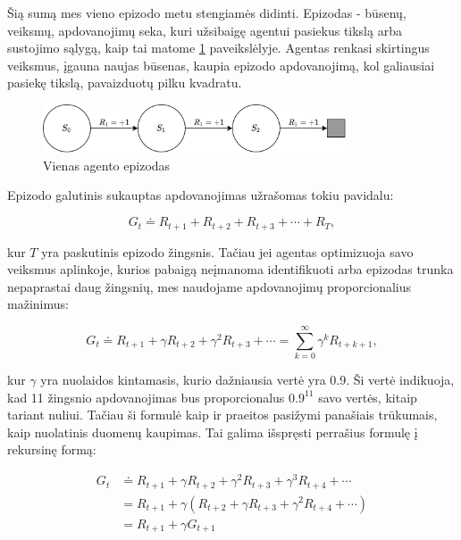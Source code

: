 \documentclass[a4paper, 12pt]{article}
\begin{document}
Šią sumą mes vieno epizodo metu stengiamės didinti. Epizodas - būsenų, veiksmų, apdovanojimų seka, kuri užsibaigę agentui pasiekus tikslą arba sustojimo sąlygą, kaip tai matome \ref{Episodas} paveikslėlyje. Agentas renkasi skirtingus veiksmus, įgauna naujas būsenas, kaupia epizodo apdovanojimą, kol galiausiai pasiekę tikslą, pavaizduotų pilku kvadratu.

\begin{figure}[h]
\centering
\includegraphics[width=0.8\textwidth]{Episodas}
\caption{Vienas agento epizodas}
\label{Episodas}
\end{figure}

Epizodo galutinis sukauptas apdovanojimas užrašomas tokiu pavidalu:

\begin{equation}
G_{t} \doteq R_{t+1}+R_{t+2}+R_{t+3}+\cdots+R_{T},
\end{equation}

kur $T$ yra paskutinis epizodo žingsnis. Tačiau jei agentas optimizuoja savo veiksmus aplinkoje, kurios pabaigą neįmanoma identifikuoti arba epizodas trunka nepaprastai daug žingsnių, mes naudojame apdovanojimų proporcionalius mažinimus:

\begin{equation}
G_{t} \doteq R_{t+1}+\gamma R_{t+2}+\gamma^{2} R_{t+3}+\cdots=\sum_{k=0}^{\infty} \gamma^{k} R_{t+k+1},
\end{equation}

kur $\gamma$ yra nuolaidos kintamasis, kurio dažniausia vertė yra 0.9. Ši vertė indikuoja, kad 11 žingsnio apdovanojimas bus proporcionalus $0.9^{11}$ savo vertės, kitaip tariant nuliui. Tačiau ši formulė kaip ir praeitos pasižymi panašiais trūkumais, kaip nuolatinis duomenų kaupimas. Tai galima išspręsti perrašius formulę į rekursinę formą:

\begin{equation}
\begin{aligned}
G_{t} & \doteq R_{t+1}+\gamma R_{t+2}+\gamma^{2} R_{t+3}+\gamma^{3} R_{t+4}+\cdots \\
&=R_{t+1}+\gamma\left(R_{t+2}+\gamma R_{t+3}+\gamma^{2} R_{t+4}+\cdots\right) \\
&=R_{t+1}+\gamma G_{t+1}
\end{aligned}
\end{equation}
\end{document}
